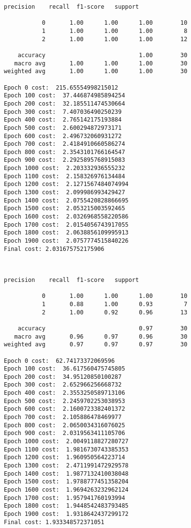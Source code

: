\documentclass[11pt]{article}
\begin{document}
    \begin{Verbatim}[commandchars=\\\{\}]
              precision    recall  f1-score   support

           0       1.00      1.00      1.00        10
           1       1.00      1.00      1.00         8
           2       1.00      1.00      1.00        12

    accuracy                           1.00        30
   macro avg       1.00      1.00      1.00        30
weighted avg       1.00      1.00      1.00        30

Epoch 0 cost:  215.65554998215012
Epoch 100 cost:  37.446874985894254
Epoch 200 cost:  32.185511474530664
Epoch 300 cost:  7.407036490250239
Epoch 400 cost:  2.765142175193884
Epoch 500 cost:  2.600294872973171
Epoch 600 cost:  2.496732060931272
Epoch 700 cost:  2.4184910660586274
Epoch 800 cost:  2.3543101766164547
Epoch 900 cost:  2.2925895768915083
Epoch 1000 cost:  2.203332936555232
Epoch 1100 cost:  2.158326976134484
Epoch 1200 cost:  2.1271567484074994
Epoch 1300 cost:  2.099986993429427
Epoch 1400 cost:  2.0755420828866695
Epoch 1500 cost:  2.053215003592465
Epoch 1600 cost:  2.0326968558220586
Epoch 1700 cost:  2.0154056743917055
Epoch 1800 cost:  2.0638856109995913
Epoch 1900 cost:  2.0757774515840226
Final cost: 2.031675752175906

    \end{Verbatim}

    \begin{center}
    \end{center}
    { \hspace*{\fill} \\}
    
    \begin{Verbatim}[commandchars=\\\{\}]
              precision    recall  f1-score   support

           0       1.00      1.00      1.00        10
           1       0.88      1.00      0.93         7
           2       1.00      0.92      0.96        13

    accuracy                           0.97        30
   macro avg       0.96      0.97      0.96        30
weighted avg       0.97      0.97      0.97        30

Epoch 0 cost:  62.74173372069596
Epoch 100 cost:  36.617560475745805
Epoch 200 cost:  34.95120850100287
Epoch 300 cost:  2.652966256668732
Epoch 400 cost:  2.3553250589713106
Epoch 500 cost:  2.2459702253038953
Epoch 600 cost:  2.1600723382401372
Epoch 700 cost:  2.105886478469977
Epoch 800 cost:  2.0650034316076025
Epoch 900 cost:  2.0319563411105706
Epoch 1000 cost:  2.0049118827280727
Epoch 1100 cost:  1.9816730743385353
Epoch 1200 cost:  1.960950564223714
Epoch 1300 cost:  2.4711991472929578
Epoch 1400 cost:  1.9877132410038048
Epoch 1500 cost:  1.9788777451358204
Epoch 1600 cost:  1.9694263232962124
Epoch 1700 cost:  1.957941760193994
Epoch 1800 cost:  1.9448542483793485
Epoch 1900 cost:  1.9318642437299172
Final cost: 1.933348572371051

    \end{Verbatim}
\end{document}
